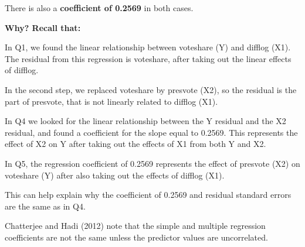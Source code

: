 \documentclass[12pt,letterpaper]{article}
\begin{document}
\begin{enumerate}
		There is also a \textbf{ coefficient of 0.2569} in both cases.
		
	\textbf{Why?	Recall that:}
			
		In Q1, we found the linear relationship between voteshare (Y) and difflog (X1). The residual from this regression is voteshare, after taking out the linear effects of difflog.
		
		In the second step, we replaced voteshare by presvote (X2), so the residual is the part of presvote, that is not linearly related to difflog (X1).
		
		In Q4 we looked for the linear relationship between the Y residual and the X2 residual, and found a coefficient for the slope equal to 0.2569. This represents the effect of X2 on Y after taking out the effects of X1 from both Y and X2.
		
		In Q5, the regression coefficient of 0.2569 represents the effect of presvote (X2) on voteshare (Y) after also taking out the effects of difflog (X1).
		
		This can help explain why the coefficient of 0.2569 and residual standard errors are the same as in Q4.
		
		Chatterjee and Hadi (2012) note that the simple and multiple regression coefficients are not the same unless the predictor values are uncorrelated.
		
	\end{enumerate}
\end{document}
